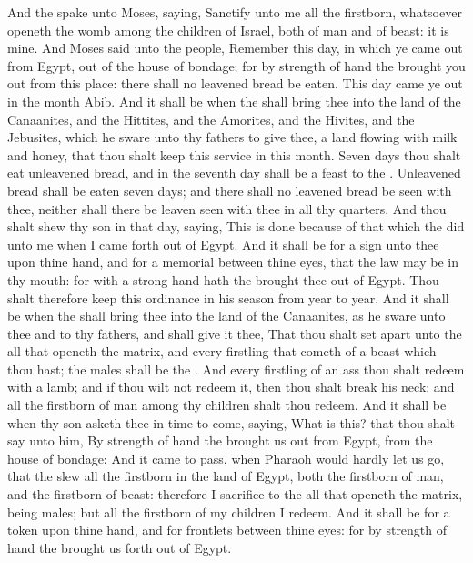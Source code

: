 \begin{biblechapter} %
 And the \LORD spake unto Moses, saying,
\verse Sanctify unto me all the firstborn, whatsoever openeth the womb among the children of Israel, both of man and of beast: it is mine.
\verse And Moses said unto the people, Remember this day, in which ye came out from Egypt, out of the house of bondage; for by strength of hand the \LORD brought you out from this place: there shall no leavened bread be eaten.
\verse This day came ye out in the month Abib.
\verse And it shall be when the \LORD shall bring thee into the land of the Canaanites, and the Hittites, and the Amorites, and the Hivites, and the Jebusites, which he sware unto thy fathers to give thee, a land flowing with milk and honey, that thou shalt keep this service in this month.
\verse Seven days thou shalt eat unleavened bread, and in the seventh day shall be a feast to the \LORD.
\verse Unleavened bread shall be eaten seven days; and there shall no leavened bread be seen with thee, neither shall there be leaven seen with thee in all thy quarters.
\verse And thou shalt shew thy son in that day, saying, This is done because of that which the \LORD did unto me when I came forth out of Egypt.
\verse And it shall be for a sign unto thee upon thine hand, and for a memorial between thine eyes, that the \LORDs law may be in thy mouth: for with a strong hand hath the \LORD brought thee out of Egypt.
\verse Thou shalt therefore keep this ordinance in his season from year to year.
\verse And it shall be when the \LORD shall bring thee into the land of the Canaanites, as he sware unto thee and to thy fathers, and shall give it thee,
\verse That thou shalt set apart unto the \LORD all that openeth the matrix, and every firstling that cometh of a beast which thou hast; the males shall be the \LORDs.
\verse And every firstling of an ass thou shalt redeem with a lamb; and if thou wilt not redeem it, then thou shalt break his neck: and all the firstborn of man among thy children shalt thou redeem.
\verse And it shall be when thy son asketh thee in time to come, saying, What is this? that thou shalt say unto him, By strength of hand the \LORD brought us out from Egypt, from the house of bondage:
\verse And it came to pass, when Pharaoh would hardly let us go, that the \LORD slew all the firstborn in the land of Egypt, both the firstborn of man, and the firstborn of beast: therefore I sacrifice to the \LORD all that openeth the matrix, being males; but all the firstborn of my children I redeem.
\verse And it shall be for a token upon thine hand, and for frontlets between thine eyes: for by strength of hand the \LORD brought us forth out of Egypt.

\end{biblechapter}
